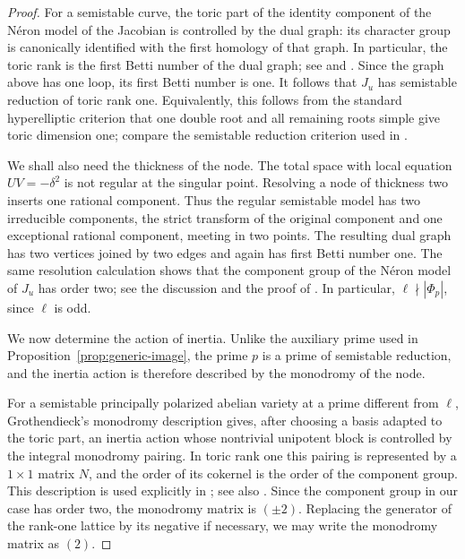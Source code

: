 \documentclass[11pt,hidelinks]{amsart}
\begin{document}
\begin{proof}
For a semistable curve, the toric part of the identity component of
the N\'eron model of the Jacobian is controlled by the dual graph:
its character group is canonically identified with the first homology
of that graph.  In particular, the toric rank is the first Betti
number of the dual graph; see
\cite[Proposition~1.1]{AriasDeReynaEtAl2016} and
\cite[Corollary~1.4]{Lorenzini1990}.  Since the graph above has one
loop, its first Betti number is one.  It follows that $J_u$ has
semistable reduction of toric rank one.  Equivalently, this follows
from the standard hyperelliptic criterion that one double root and all
remaining roots simple give toric dimension one; compare the
semistable reduction criterion used in
\cite[\S2]{AnniDokchitser2020}.

We shall also need the thickness of the node.  The total space with
local equation $UV=-\delta^2$ is not regular at the singular point.
Resolving a node of thickness two inserts one rational component.
Thus the regular semistable model has two irreducible components, the
strict transform of the original component and one exceptional
rational component, meeting in two points.  The resulting dual graph
has two vertices joined by two edges and again has first Betti number
one.  The same resolution calculation shows that the component group
of the N\'eron model of $J_u$ has order two; see the discussion and
the proof of
\cite[Proposition~2.3]{AriasDeReynaEtAl2016}.  In particular,
$\ell\nmid|\Phi_p|$, since $\ell$ is odd.

We now determine the action of inertia. Unlike the auxiliary prime used
in Proposition~\ref{prop:generic-image}, the prime $p$ is a prime of
semistable reduction, and the inertia action is therefore described by
the monodromy of the node.

For a semistable principally polarized abelian variety at a prime
different from $\ell$, Grothendieck's monodromy description gives,
after choosing a basis adapted to the toric part, an inertia action
whose nontrivial unipotent block is controlled by the integral
monodromy pairing.  In toric rank one this pairing is represented by a
$1\times1$ matrix $N$, and the order of its cokernel is the order of
the component group.  This description is used explicitly in
\cite[Lemma~2.9]{AnniDokchitser2020}; see also
\cite[Lemma~3]{HallOpen2011}.  Since the component group in our case
has order two, the monodromy matrix is $(\pm2)$.  Replacing the
generator of the rank-one lattice by its negative if necessary, we
may write the monodromy matrix as $(2)$.


\end{proof}
\end{document}
